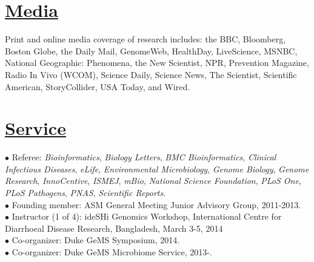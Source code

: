 \documentclass[overlapped,line,11pt]{res}
\begin{document}
\begin{resume}
\begin{itemize}[leftmargin=1cm, style=sameline, itemsep=0mm]
\end{itemize}

\section{\underline{\sc Media}} 
\vspace{.05in} Print and online media coverage of research includes:
the BBC, Bloomberg, Boston Globe, the Daily Mail, GenomeWeb,
HealthDay, LiveScience, MSNBC, National Geographic: Phenomena, the New
Scientist, NPR, Prevention Magazine, Radio In Vivo (WCOM), Science Daily, Science News, The
Scientist, Scientific American, StoryCollider, USA Today, and Wired.


\section{\underline{\sc Service}}
\vspace{.05in}

\hangindent=0.5in $\bullet$\hspace{.1in} Referee:
\emph{Bioinformatics}, \emph{Biology Letters}, \emph{BMC Bioinformatics}, \emph{Clinical
  Infectious Diseases}, \emph{eLife}, \emph{Environmental Microbiology}, \emph{Genome Biology}, \emph{Genome
  Research}, \emph{InnoCentive}, \emph{ISMEJ}, \emph{mBio}, \emph{National Science Foundation}, \emph{PLoS One},
\emph{PLoS Pathogens}, \emph{PNAS}, \emph{Scientific Reports}. \\

\vspace{-10mm}
\hangindent=0.5in $\bullet$\hspace{.1in} Founding member: ASM General Meeting
Junior Advisory Group, 2011-2013. \\

\vspace{-10mm}
\hangindent=0.5in $\bullet$\hspace{.1in} Instructor (1 of 4): ideSHi
Genomics Workshop, International Centre for Diarrhoeal
Disease Research, Bangladesh, March 3-5, 2014 \\

\vspace{-10mm}
\hangindent=0.5in $\bullet$\hspace{.1in} Co-organizer: Duke GeMS
Symposium, 2014. \\

\vspace{-10mm}
\hangindent=0.5in $\bullet$\hspace{.1in} Co-organizer: Duke GeMS
Microbiome Service, 2013-. \\


\end{resume}
\end{document}

